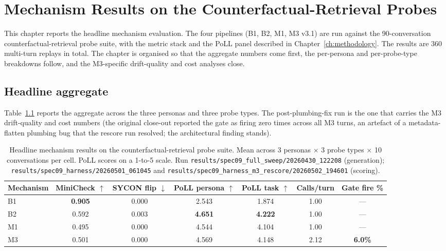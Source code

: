 \chapter{Mechanism Results on the Counterfactual-Retrieval Probes}
\label{ch:mechanism-results}

This chapter reports the headline mechanism evaluation. The four pipelines (B1, B2, M1, M3 v3.1) are run against the 90-conversation counterfactual-retrieval probe suite, with the metric stack and the PoLL panel described in Chapter~\ref{ch:methodology}. The results are 360 multi-turn replays in total. The chapter is organised so that the aggregate numbers come first, the per-persona and per-probe-type breakdowns follow, and the M3-specific drift-quality and cost analyses close.

\section{Headline aggregate}
\label{sec:headline-aggregate}

Table~\ref{tab:headline-results} reports the aggregate across the three personas and three probe types. The post-plumbing-fix run is the one that carries the M3 drift-quality and cost numbers (the original close-out reported the gate as firing zero times across all M3 turns, an artefact of a metadata-flatten plumbing bug that the rescore run resolved; the architectural finding stands).

\begin{table}[H]
  \centering
  \small
  \caption{Headline mechanism results on the counterfactual-retrieval probe suite. Mean across 3 personas $\times$ 3 probe types $\times$ 10 conversations per cell. PoLL scores on a 1-to-5 scale. Run \texttt{results/spec09\_full\_sweep/20260430\_122208} (generation); \texttt{results/spec09\_harness/20260501\_061045} and \texttt{results/spec09\_harness\_m3\_rescore/20260502\_194601} (scoring).}
  \label{tab:headline-results}
  \begin{tabularx}{\textwidth}{l c c c c c c}
    \toprule
    \textbf{Mechanism} & \textbf{MiniCheck $\uparrow$} & \textbf{SYCON flip $\downarrow$} & \textbf{PoLL persona $\uparrow$} & \textbf{PoLL task $\uparrow$} & \textbf{Calls/turn} & \textbf{Gate fire \%} \\
    \midrule
    B1 & \textbf{0.905} & 0.000 & 2.543 & 1.874 & 1.00 & --- \\
    B2 & 0.592 & 0.003 & \textbf{4.651} & \textbf{4.222} & 1.00 & --- \\
    M1 & 0.495 & 0.000 & 4.544 & 4.104 & 1.00 & --- \\
    M3 & 0.501 & 0.000 & 4.569 & 4.148 & 2.12 & \textbf{6.0\%} \\
    \bottomrule
  \end{tabularx}
\end{table}

